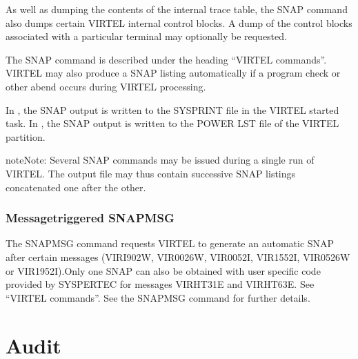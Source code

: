 \documentclass[letterpaper,10pt,english]{sphinxmanual}
\begin{document}
\sphinxAtStartPar
As well as dumping the contents of the internal trace table, the SNAP command also dumps certain VIRTEL internal control blocks. A dump of the control blocks associated with a particular terminal may optionally be requested.

\sphinxAtStartPar
The SNAP command is described under the heading “VIRTEL commands”. VIRTEL may also produce a SNAP listing automatically if a program check or other abend occurs during VIRTEL processing.

\sphinxAtStartPar
In , the SNAP output is written to the SYSPRINT file in the VIRTEL started task.
In , the SNAP output is written to the POWER LST file of the VIRTEL partition.

\begin{sphinxadmonition}{note}{Note:}
\sphinxAtStartPar
Several SNAP commands may be issued during a single run of VIRTEL. The output file may thus contain successive SNAP listings concatenated one after the other.
\end{sphinxadmonition}

\sphinxAtStartPar
{}

\sphinxAtStartPar
{}

\ignorespaces 

\subsection{Message\sphinxhyphen{}triggered SNAPMSG}
\label{\detokenize{audit_operations_ and_performance:message-triggered-snapmsg}}\label{\detokenize{audit_operations_ and_performance:index-82}}
\sphinxAtStartPar
The SNAPMSG command requests VIRTEL to generate an automatic SNAP after certain messages (VIRI902W, VIR0026W, VIR0052I, VIR1552I, VIR0526W or VIR1952I).Only one SNAP can also be obtained with user specific code provided by SYSPERTEC for messages VIRHT31E and VIRHT63E. See “VIRTEL commands”. See the SNAPMSG command for further details.

\ignorespaces 

\chapter{Audit}
\label{\detokenize{audit_operations_ and_performance:audit}}\label{\detokenize{audit_operations_ and_performance:index-83}}
\ignorespaces 
\end{document}
